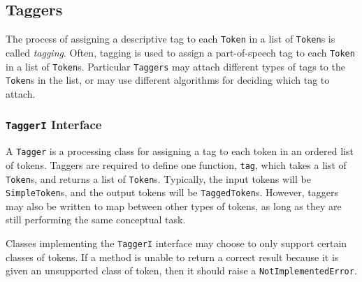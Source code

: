 \documentclass{article}
\begin{document}
\subsection{Taggers}

The process of assigning a descriptive tag to each \texttt{Token} in a
list of \texttt{Token}s is called \emph{tagging}.  Often, tagging is
used to assign a part-of-speech tag to each \texttt{Token} in a list
of \texttt{Token}s.  Particular \texttt{Taggers} may attach different
types of tags to the \texttt{Token}s in the list, or may use different
algorithms for deciding which tag to attach.

\subsubsection{\texttt{TaggerI} Interface}

    A \texttt{Tagger} is a processing class for assigning a tag to
    each token in an ordered list of tokens.  Taggers are required to
    define one function, \texttt{tag}, which takes a list of
    \texttt{Token}s, and returns a list of \texttt{Token}s.
    Typically, the input tokens will be \texttt{SimpleToken}s, and the
    output tokens will be \texttt{TaggedToken}s.  However, taggers may
    also be written to map between other types of tokens, as long as
    they are still performing the same conceptual task.

    Classes implementing the \texttt{TaggerI} interface may choose to
    only support certain classes of tokens.  If a method is unable to
    return a correct result because it is given an unsupported class
    of token, then it should raise a \texttt{NotImplementedError}.
\end{document}
